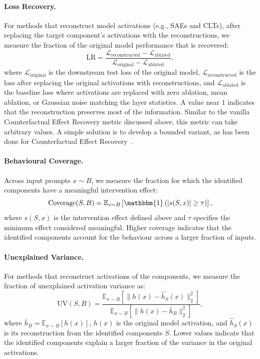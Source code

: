 \begin{definitionbox}

\paragraph{Loss Recovery.}
For methods that reconstruct model activations (e.g., SAEs and CLTs), after replacing the target component's activations with the reconstructions, we measure the fraction of the original model performance that is recovered:
\[
\mathrm{LR}
=
\frac{
\mathcal{L}_{\mathrm{reconstructed}}
-
\mathcal{L}_{\mathrm{ablated}}
}{
\mathcal{L}_{\mathrm{original}}
-
\mathcal{L}_{\mathrm{ablated}}
},
\]
where \(\mathcal{L}_{\mathrm{original}}\) is the downstream test loss of the original model, \(\mathcal{L}_{\mathrm{reconstructed}}\) is the loss after replacing the original activations with reconstructions, and \(\mathcal{L}_{\mathrm{ablated}}\) is the baseline loss where activations are replaced with zero ablation, mean ablation, or Gaussian noise matching the layer statistics. A value near $1$ indicates that the reconstruction preserves most of the information. Similar to the vanilla Counterfactual Effect Recovery metric discussed above, this metric can take arbitrary values. A simple solution is to develop a bounded variant, as has been done for Counterfactual Effect Recovery~.\\

\paragraph{Behavioural Coverage.}
Across input prompts $x \sim B$, we measure the fraction for which the identified components have a meaningful intervention effect:
\[
\mathrm{Coverage}(S,B)
=
\mathbb{E}_{x \sim B}
\left[
\mathbbm{1}
\left(
|s(S,x)| \geq \tau
\right)
\right],
\]
where \(s(S,x)\) is the intervention effect defined above and \(\tau\) specifies the minimum effect considered meaningful. Higher coverage indicates that the identified components account for the behaviour across a larger fraction of inputs.\\

\paragraph{Unexplained Variance.}
For methods that reconstruct activations of the components, we measure the fraction of unexplained activation variance as:
\[
\mathrm{UV}(S,B)
=
\frac{
\mathbb{E}_{x \sim B}
\left[
\|h(x)-\hat{h}_S(x)\|_2^2
\right]
}{
\mathbb{E}_{x \sim B}
\left[
\|h(x)-\bar{h}_B\|_2^2
\right]
},
\]
where $\bar{h}_B = \mathbb{E}_{x \sim B}[h(x)]$, \(h(x)\) is the original model activation, and \(\hat{h}_S(x)\) is its reconstruction from the identified components \(S\). Lower values indicate that the identified components explain a larger fraction of the variance in the original activations.

\end{definitionbox}


